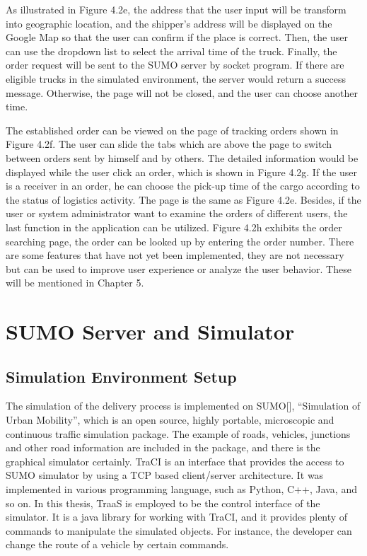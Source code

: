 \documentclass[12pt]{ksthesis}
\begin{document}
\begin{thesis}
{As illustrated in Figure 4.2e, the address that the user input will be transform into geographic location, and the shipper’s address will be displayed on the Google Map so that the user can confirm if the place is correct. Then, the user can use the dropdown list to select the arrival time of the truck. Finally, the order request will be sent to the SUMO server by socket program. If there are eligible trucks in the simulated environment, the server would return a success message. Otherwise, the page will not be closed, and the user can choose another time.  

The established order can be viewed on the page of tracking orders shown in Figure 4.2f. The user can slide the tabs which are above the page to switch between orders sent by himself and by others. The detailed information would be displayed while the user click an order, which is shown in Figure 4.2g. If the user is a receiver in an order, he can choose the pick-up time of the cargo according to the status of logistics activity. The page is the same as Figure 4.2e. Besides, if the user or system administrator want to examine the orders of different users, the last function in the application can be utilized. Figure 4.2h exhibits the order searching page, the order can be looked up by entering the order number. There are some features that have not yet been implemented, they are not necessary but can be used to improve user experience or analyze the user behavior. These will be mentioned in Chapter 5.



\section{SUMO Server and Simulator}

\subsection{Simulation Environment Setup}

The simulation of the delivery process is implemented on SUMO[], “Simulation of Urban Mobility”, which is an open source, highly portable, microscopic and continuous traffic simulation package. The example of roads, vehicles, junctions and other road information are included in the package, and there is the graphical simulator certainly. TraCI is an interface that provides the access to SUMO simulator by using a TCP based client/server architecture. It was implemented in various programming language, such as Python, C++, Java, and so on. In this thesis, TraaS is employed to be the control interface of the simulator. It is a java library for working with TraCI, and it provides plenty of commands to manipulate the simulated objects. For instance, the developer can change the route of a vehicle by certain commands.

}
\end{thesis}
\end{document}
